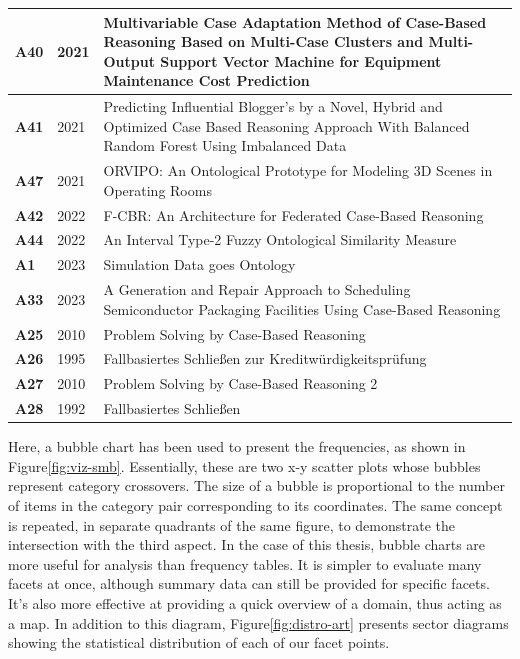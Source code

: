 {\begin{longtable}{ | m{1cm} | m{1.5cm} | m{12cm} | }
                    \hline
                    \textbf{A40} &2021 &Multivariable Case Adaptation Method of Case-Based Reasoning Based on Multi-Case Clusters and Multi-Output Support Vector Machine for Equipment Maintenance Cost Prediction \\
                    \hline
                    \textbf{A41} &2021 &Predicting Influential Blogger’s by a Novel, Hybrid and Optimized Case Based Reasoning Approach With Balanced Random Forest Using Imbalanced Data \\
                    \hline
                    \textbf{A47} &2021 &ORVIPO: An Ontological Prototype for Modeling 3D Scenes in Operating Rooms \\
                    \hline
                    \textbf{A42} &2022 &F-CBR: An Architecture for Federated Case-Based Reasoning \\
                    \hline
                    \textbf{A44} &2022 &An Interval Type-2 Fuzzy Ontological Similarity Measure \\
                    \hline
                    \textbf{A1} &2023 &Simulation Data goes Ontology \\
                    \hline
                    \textbf{A33} &2023 &A Generation and Repair Approach to Scheduling Semiconductor Packaging Facilities Using Case-Based Reasoning \\
                    \hline
                    \textbf{A25} &2010 &Problem Solving by Case-Based Reasoning \\
                    \hline
                    \textbf{A26} &1995 &Fallbasiertes Schließen zur Kreditwürdigkeitsprüfung \\
                    \hline
                    \textbf{A27} &2010 &Problem Solving by Case-Based Reasoning 2 \\
                    \hline
                    \textbf{A28} &1992 &Fallbasiertes Schließen \\
                    \hline
                \end{longtable}}
            
            Here, a bubble chart has been used to present the frequencies, as shown in Figure\ref{fig:viz-smb}. Essentially, these are two x-y scatter plots whose bubbles represent category crossovers. The size of a bubble is proportional to the number of items in the category pair corresponding to its coordinates. The same concept is repeated, in separate quadrants of the same figure, to demonstrate the intersection with the third aspect. In the case of this thesis, bubble charts are more useful for analysis than frequency tables. It is simpler to evaluate many facets at once, although summary data can still be provided for specific facets. It's also more effective at providing a quick overview of a domain, thus acting as a map. In addition to this diagram, Figure\ref{fig:distro-art} presents sector diagrams showing the statistical distribution of each of our facet points.

